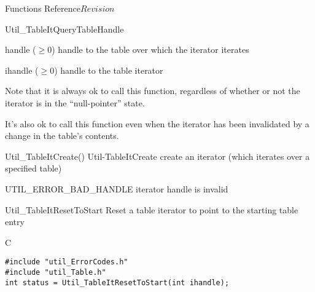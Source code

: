 \begin{cactuspart}{ Functions Reference}{}{$Revision$}
\begin{FunctionDescription}{Util\_TableItQueryTableHandle}
\begin{ResultSection}
\begin{Result}{handle ($\ge 0$)}
handle to the table over which the iterator iterates
\end{Result}
\end{ResultSection}

\begin{ParameterSection}
\begin{Parameter}{ihandle ($\ge 0$)}
handle to the table iterator
\end{Parameter}
\end{ParameterSection}

\begin{Discussion}
Note that it is always ok to call this function, regardless of
whether or not the iterator is in the ``null-pointer'' state.

It's also ok to call this function even when the iterator has been
invalidated by a change in the table's contents.
\end{Discussion}

\begin{SeeAlsoSection}
\begin{SeeAlso2} {Util\_TableItCreate()} {Util-TableItCreate}
create an iterator (which iterates over a specified table)
\end{SeeAlso2}
\end{SeeAlsoSection}

\begin{ErrorSection}
\begin{Error}{UTIL\_ERROR\_BAD\_HANDLE}
iterator handle is invalid
\end{Error}
\end{ErrorSection}
\end{FunctionDescription}


\begin{FunctionDescription}{Util\_TableItResetToStart}
\label{Util-TableItResetToStart}
Reset a table iterator to point to the starting table entry

\begin{SynopsisSection}
\begin{Synopsis}{C}
\begin{verbatim}
#include "util_ErrorCodes.h"
#include "util_Table.h"
int status = Util_TableItResetToStart(int ihandle);
\end{verbatim}
\end{Synopsis}
\end{SynopsisSection}


\end{FunctionDescription}
\end{cactuspart}
